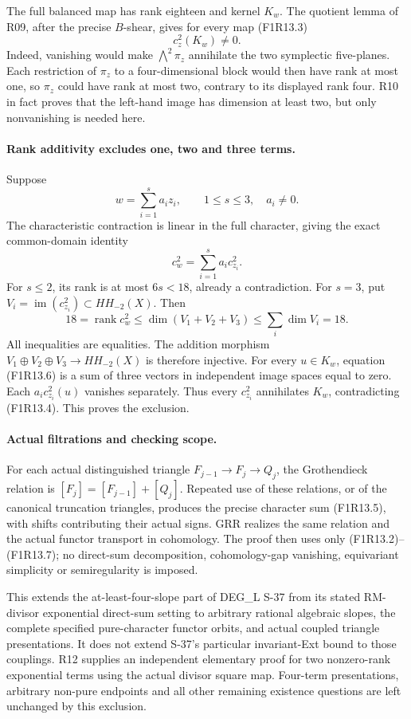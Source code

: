 The full balanced map has rank eighteen and kernel $K_w$.
The quotient lemma of R09, after the precise $B$-shear,
gives for every map (F1R13.3)
\[
                     c_z^2(K_w)\ne0.
 \tag{F1R13.4}
\]
Indeed, vanishing would make $\bigwedge^2\pi_z$ annihilate
the two symplectic five-planes. Each restriction of $\pi_z$
to a four-dimensional block would then have rank at most
one, so $\pi_z$ could have rank at most two, contrary to
its displayed rank four. R10 in fact proves that the
left-hand image has dimension at least two, but only
nonvanishing is needed here.

\paragraph{Rank additivity excludes one, two and three terms.}
Suppose
\[
                     w=\sum_{i=1}^{s}a_i z_i,
                   \qquad 1\le s\le3,\quad a_i\ne0.
 \tag{F1R13.5}
\]
The characteristic contraction is linear in the full
character, giving the exact common-domain identity
\[
                  c_w^2=\sum_{i=1}^s a_i c_{z_i}^2.
 \tag{F1R13.6}
\]
For $s\le2$, its rank is at most $6s<18$, already a
contradiction. For $s=3$, put
$V_i=\operatorname{im}(c_{z_i}^2)\subset HH_{-2}(X)$.
Then
\[
 18=\operatorname{rank}c_w^2
       \le\dim(V_1+V_2+V_3)\le\sum_i\dim V_i=18.
 \tag{F1R13.7}
\]
All inequalities are equalities. The addition morphism
$V_1\oplus V_2\oplus V_3\to HH_{-2}(X)$ is therefore
injective. For every $u\in K_w$, equation (F1R13.6)
is a sum of three vectors in independent image spaces
equal to zero. Each $a_i c_{z_i}^2(u)$ vanishes separately.
Thus every $c_{z_i}^2$ annihilates $K_w$, contradicting
(F1R13.4). This proves the exclusion.

\paragraph{Actual filtrations and checking scope.}
For each actual distinguished triangle $F_{j-1}\to F_j\to Q_j$,
the Grothendieck relation is $[F_j]=[F_{j-1}]+[Q_j]$.
Repeated use of these relations, or of the canonical
truncation triangles, produces the precise character sum
(F1R13.5), with shifts contributing their actual signs.
GRR realizes the same relation and the actual functor
transport in cohomology. The proof then uses only
(F1R13.2)--(F1R13.7); no direct-sum decomposition,
cohomology-gap vanishing, equivariant simplicity or
semiregularity is imposed.

This extends the at-least-four-slope part of DEG\_L S-37
from its stated RM-divisor exponential direct-sum setting
to arbitrary rational algebraic slopes, the complete
specified pure-character functor orbits, and actual
coupled triangle presentations. It does not extend S-37's
particular invariant-Ext bound to those couplings.
R12 supplies an independent elementary proof for two
nonzero-rank exponential terms using the actual divisor
square map. Four-term presentations, arbitrary
non-pure endpoints and all other remaining existence
questions are left unchanged by this exclusion.

